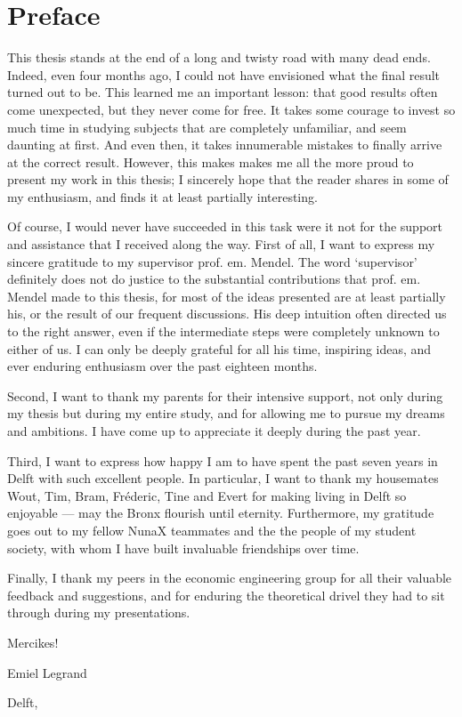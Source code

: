 \chapter{Preface}
\thispagestyle{empty}
This thesis stands at the end of a long and twisty road with many dead ends. Indeed, even four months ago, I could not have envisioned what the final result turned out to be. This learned me an important lesson: that good results often come unexpected, but they never come for free. It takes some courage to invest so much time in studying subjects that are completely unfamiliar, and seem daunting at first. And even then, it takes innumerable mistakes to finally arrive at the correct result. 
However, this makes makes me all the more proud to present my work in this thesis; I sincerely hope that the reader shares in some of my enthusiasm, and finds it at least partially interesting.

Of course, I would never have succeeded in this task were it not for the support and assistance that I received along the way. First of all, I want to express my sincere gratitude to my supervisor prof. em. Mendel. The word `supervisor' definitely does not do justice to the substantial contributions that prof. em. Mendel made to this thesis, for most of the ideas presented are at least partially his, or the result of our frequent discussions. His deep intuition often directed us to the right answer, even if the intermediate steps were completely unknown to either of us. I can only be deeply grateful for all his time, inspiring ideas, and ever enduring enthusiasm over the past eighteen months. 

Second, I want to thank my parents for their intensive support, not only during my thesis but during my entire study, and for allowing me to pursue my dreams and ambitions. I have come up to appreciate it deeply during the past year.

Third, I want to express how happy I am to have spent the past seven years in Delft with such excellent people. In particular, I want to thank my housemates Wout, Tim, Bram, Fréderic, Tine and Evert for making living in Delft so enjoyable --- may the Bronx flourish until eternity. Furthermore, my gratitude goes out to my fellow NunaX teammates and the the people of my student society, with whom I have built invaluable friendships over time.

Finally, I thank my peers in the economic engineering group for all their valuable feedback and suggestions, and for enduring the theoretical drivel they had to sit through during my presentations.

Mercikes!

\begin{flushright}
    Emiel Legrand
\end{flushright}
Delft, \mscdate



